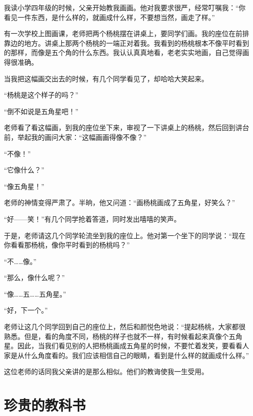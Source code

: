 \documentclass[12pt,UTF-8,openany]{ctexbook}
\begin{document}
\begin{large}
    
    我读小学四年级的时候，父亲开始教我画画。他对我要求很严，经常叮嘱我：“你看见一件东西，是什么样的，就画成什么样，不要想当然，画走了样。”
    
    有一次学校上图画课，老师把两个杨桃摆在讲桌上，要同学们画。我的座位在前排靠边的地方。讲桌上那两个杨桃的一端正对着我。我看到的杨桃根本不像平时看到的那样，而像是五个角的什么东西。我认认真真地看，老老实实地画，自己觉得画得很准确。
    
    当我把这幅画交出去的时候，有几个同学看见了，却哈哈大笑起来。
    
    “杨桃是这个样子的吗？”
    
    “倒不如说是五角星吧！”
    
    老师看了看这幅画，到我的座位坐下来，审视了一下讲桌上的杨桃，然后回到讲台前，举起我的画问大家：“这幅画画得像不像？”
    
    “不像！”
    
    “它像什么？”
    
    “像五角星！”
    
    老师的神情变得严肃了。半晌，他又问道：“画杨桃画成了五角星，好笑么？”
    
    “好——笑！”有几个同学抢着答道，同时发出嘻嘻的笑声。
    
    于是，老师请这几个同学轮流坐到我的座位上。他对第一个坐下的同学说：“现在你看看那杨桃，像你平时看到的杨桃吗？”
    
    “不……像。”
    
    “那么，像什么呢？”
    
    “像……五……五角星。”
    
    “好，下一个。”
    
    老师让这几个同学回到自己的座位上，然后和颜悦色地说：“提起杨桃，大家都很熟悉。但是，看的角度不同，杨桃的样子也就不一样，有时候看起来真像个五角星。因此，当我们看见别的人把杨桃画成五角星的时候，不要忙着发笑，要看看人家是从什么角度看的。我们应该相信自己的眼睛，看到是什么样的就画成什么样。”
    
    这位老师的话同我父亲讲的是那么相似。他们的教诲使我一生受用。
    
\end{large}



\chapter{珍贵的教科书}
\end{document}
